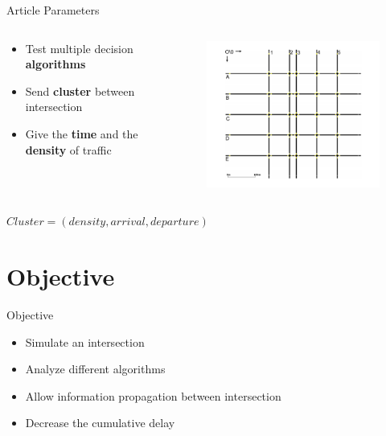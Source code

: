 \documentclass[]{beamer}
\begin{document}
\begin{frame}{Article Parameters}
 \begin{columns}
  \begin{column}[c]{5cm}
   \begin{itemize}
    \item Test multiple decision \textbf{algorithms}
    \item Send \textbf{cluster} between intersection
    \item Give the \textbf{time} and the \textbf{density} of traffic
   \end{itemize}
  \end{column}

  \begin{column}[c]{5cm}
   \begin{figure}
    \centering
    \includegraphics[width=\textwidth]{img/grid.png}
   \end{figure}
  \end{column}
 \end{columns}
 $Cluster = (density, arrival, departure)$
\end{frame}


\section{Objective}
\begin{frame}{Objective}
 \begin{itemize}
  \item Simulate an intersection
  \item Analyze different algorithms
  \item Allow information propagation between intersection
  \item Decrease the cumulative delay
 \end{itemize}
\end{frame}
\end{document}
